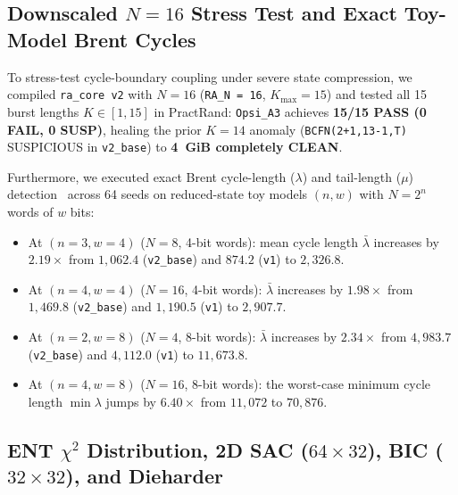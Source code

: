 \documentclass[conference]{IEEEtran}
\begin{document}
\subsection{Downscaled $N=16$ Stress Test and Exact Toy-Model Brent Cycles}

To stress-test cycle-boundary coupling under severe state compression, we compiled \texttt{ra\_core v2} with $N = 16$ (\texttt{RA\_N = 16}, $K_{\max} = 15$) and tested all 15 burst lengths $K \in [1, 15]$ in PractRand: \texttt{Opsi\_A3} achieves \textbf{15/15 PASS (0 FAIL, 0 SUSP)}, healing the prior $K=14$ anomaly (\texttt{BCFN(2+1,13-1,T)} SUSPICIOUS in \texttt{v2\_base}) to \textbf{4~GiB completely CLEAN}.

Furthermore, we executed exact Brent cycle-length ($\lambda$) and tail-length ($\mu$) detection~\cite{brent1980improved,flajolet2009analytic,finch2022components} across 64 seeds on reduced-state toy models $(n, w)$ with $N = 2^n$ words of $w$ bits:
\begin{itemize}
    \item At $(n=3, w=4)$ ($N=8$, 4-bit words): mean cycle length $\bar{\lambda}$ increases by \textbf{$2.19\times$} from $1{,}062.4$ (\texttt{v2\_base}) and $874.2$ (\texttt{v1}) to \textbf{$2{,}326.8$}.
    \item At $(n=4, w=4)$ ($N=16$, 4-bit words): $\bar{\lambda}$ increases by \textbf{$1.98\times$} from $1{,}469.8$ (\texttt{v2\_base}) and $1{,}190.5$ (\texttt{v1}) to \textbf{$2{,}907.7$}.
    \item At $(n=2, w=8)$ ($N=4$, 8-bit words): $\bar{\lambda}$ increases by \textbf{$2.34\times$} from $4{,}983.7$ (\texttt{v2\_base}) and $4{,}112.0$ (\texttt{v1}) to \textbf{$11{,}673.8$}.
    \item At $(n=4, w=8)$ ($N=16$, 8-bit words): the worst-case minimum cycle length $\min \lambda$ jumps by \textbf{$6.40\times$} from $11{,}072$ to \textbf{$70{,}876$}.
\end{itemize}

\subsection{ENT $\chi^2$ Distribution, 2D SAC ($64\times 32$), BIC ($32\times 32$), and Dieharder}
\end{document}
